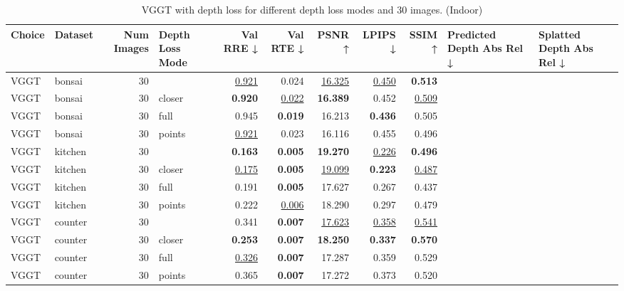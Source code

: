\begin{table}[H]
\caption{VGGT with depth loss for different depth loss modes and $30$ images. (Indoor)}
\label{tab:05_depth_loss_sparse_indoor}
\centering
\scriptsize
\begin{tabular}{llrlrrrrrll}
\toprule
Choice & Dataset & Num Images & Depth Loss Mode & Val RRE ↓ & Val RTE ↓ & PSNR ↑ & LPIPS ↓ & SSIM ↑ & Predicted Depth Abs Rel ↓ & Splatted Depth Abs Rel ↓ \\
\midrule
VGGT & bonsai & 30 &  & \underline{0.921} & 0.024 & \underline{16.325} & \underline{0.450} & \textbf{0.513} &  &  \\
VGGT & bonsai & 30 & closer & \textbf{0.920} & \underline{0.022} & \textbf{16.389} & 0.452 & \underline{0.509} &  &  \\
VGGT & bonsai & 30 & full & 0.945 & \textbf{0.019} & 16.213 & \textbf{0.436} & 0.505 &  &  \\
VGGT & bonsai & 30 & points & \underline{0.921} & 0.023 & 16.116 & 0.455 & 0.496 &  &  \\
\midrule
VGGT & kitchen & 30 &  & \textbf{0.163} & \textbf{0.005} & \textbf{19.270} & \underline{0.226} & \textbf{0.496} &  &  \\
VGGT & kitchen & 30 & closer & \underline{0.175} & \textbf{0.005} & \underline{19.099} & \textbf{0.223} & \underline{0.487} &  &  \\
VGGT & kitchen & 30 & full & 0.191 & \textbf{0.005} & 17.627 & 0.267 & 0.437 &  &  \\
VGGT & kitchen & 30 & points & 0.222 & \underline{0.006} & 18.290 & 0.297 & 0.479 &  &  \\
\midrule
VGGT & counter & 30 &  & 0.341 & \textbf{0.007} & \underline{17.623} & \underline{0.358} & \underline{0.541} &  &  \\
VGGT & counter & 30 & closer & \textbf{0.253} & \textbf{0.007} & \textbf{18.250} & \textbf{0.337} & \textbf{0.570} &  &  \\
VGGT & counter & 30 & full & \underline{0.326} & \textbf{0.007} & 17.287 & 0.359 & 0.529 &  &  \\
VGGT & counter & 30 & points & 0.365 & \textbf{0.007} & 17.272 & 0.373 & 0.520 &  &  \\
\bottomrule
\end{tabular}
\end{table}